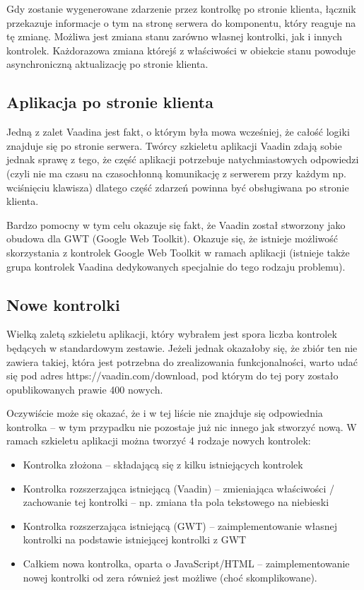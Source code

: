 Gdy zostanie wygenerowane zdarzenie przez kontrolkę po stronie klienta, łącznik przekazuje informacje o tym na stronę serwera do komponentu, który reaguje na tę zmianę. Możliwa jest zmiana stanu zarówno własnej kontrolki, jak i innych kontrolek. Każdorazowa zmiana którejś z właściwości w obiekcie stanu powoduje asynchroniczną aktualizację po stronie klienta.

\newpage
\subsection{Aplikacja po stronie klienta}
Jedną z zalet Vaadina jest fakt, o którym była mowa wcześniej, że całość logiki znajduje się po stronie serwera. Twórcy szkieletu aplikacji Vaadin zdają sobie jednak sprawę z tego, że część aplikacji potrzebuje natychmiastowych odpowiedzi (czyli nie ma czasu na czasochłonną komunikację z serwerem przy każdym np. wciśnięciu klawisza) dlatego część zdarzeń powinna być obsługiwana po stronie klienta. 

Bardzo pomocny w tym celu okazuje się fakt, że Vaadin został stworzony jako obudowa dla GWT (Google Web Toolkit). Okazuje się, że istnieje możliwość skorzystania z kontrolek Google Web Toolkit w ramach aplikacji (istnieje także grupa kontrolek Vaadina dedykowanych specjalnie do tego rodzaju problemu).

\subsection{Nowe kontrolki}
Wielką zaletą szkieletu aplikacji, który wybrałem jest spora liczba kontrolek będących w standardowym zestawie. Jeżeli jednak okazałoby się, że zbiór ten nie zawiera takiej, która jest potrzebna do zrealizowania funkcjonalności, warto udać się pod adres https://vaadin.com/download, pod którym do tej pory zostało opublikowanych prawie 400 nowych. 

Oczywiście może się okazać, że i w tej liście nie znajduje się odpowiednia kontrolka – w tym przypadku nie pozostaje już nic innego jak stworzyć nową. W ramach szkieletu aplikacji można tworzyć 4 rodzaje nowych kontrolek:
\begin{itemize}
\item Kontrolka złożona – składającą się z kilku istniejących kontrolek
\item Kontrolka rozszerzająca istniejącą (Vaadin) – zmieniająca właściwości / zachowanie tej kontrolki – np. zmiana tła pola tekstowego na niebieski
\item Kontrolka rozszerzająca istniejącą (GWT) – zaimplementowanie własnej kontrolki na podstawie istniejącej kontrolki z GWT
\item Całkiem nowa kontrolka, oparta o JavaScript/HTML – zaimplementowanie nowej kontrolki od zera również jest możliwe (choć skomplikowane).
\end{itemize}

